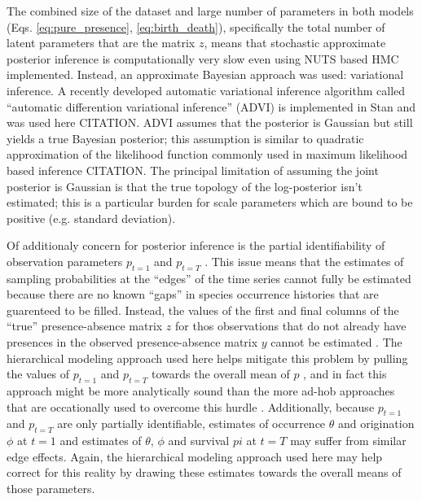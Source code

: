 \documentclass[12pt,letterpaper]{article}
\begin{document}
The combined size of the dataset and large number of parameters in both models (Eqs. \ref{eq:pure_presence}, \ref{eq:birth_death}), specifically the total number of latent parameters that are the matrix \(z\), means that stochastic approximate posterior inference is computationally very slow even using NUTS based HMC implemented. Instead, an approximate Bayesian approach was used: variational inference. A recently developed automatic variational inference algorithm called ``automatic differention variational inference'' (ADVI) is implemented in Stan and was used here CITATION. ADVI assumes that the posterior is Gaussian but still yields a true Bayesian posterior; this assumption is similar to quadratic approximation of the likelihood function commonly used in maximum likelihood based inference CITATION. The principal limitation of assuming the joint posterior is Gaussian is that the true topology of the log-posterior isn't estimated; this is a particular burden for scale parameters which are bound to be positive (e.g. standard deviation).

Of additionaly concern for posterior inference is the partial identifiability of observation parameters \(p_{t = 1}\) and \(p_{t = T}\) \citep{Royle2008}. This issue means that the estimates of sampling probabilities at the ``edges'' of the time series cannot fully be estimated because there are no known ``gaps'' in species occurrence histories that are guarenteed to be filled. Instead, the values of the first and final columns of the ``true'' presence-absence matrix \(z\) for thos observations that do not already have presences in the observed presence-absence matrix \(y\) cannot be estimated \citep{Royle2008}. The hierarchical modeling approach used here helps mitigate this problem by pulling the values of \(p_{t = 1}\) and \(p_{t = T}\) towards the overall mean of \(p\) \citep{Gelman2013d}, and in fact this approach might be more analytically sound than the more ad-hob approaches that are occationally used to overcome this hurdle \citep{Royle2008}. Additionally, because \(p_{t = 1}\) and \(p_{t = T}\) are only partially identifiable, estimates of occurrence \(\theta\) and origination \(\phi\) at \(t = 1\) and estimates of \(\theta\), \(\phi\) and survival \(pi\) at \(t = T\) may suffer from similar edge effects. Again, the hierarchical modeling approach used here may help correct for this reality by drawing these estimates towards the overall means of those parameters.
\end{document}
